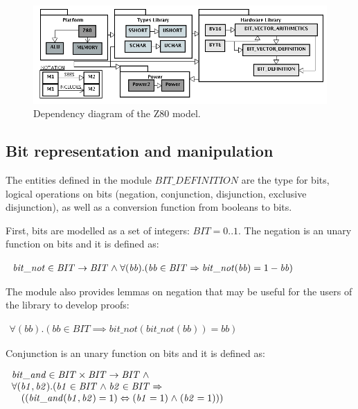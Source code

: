 \documentclass[11pt]{article} %
\begin{document}
\begin{figure}[h] \centering
\includegraphics[width=.92\textwidth]{diagramaEstrutural_vertical.png}
 \caption{Dependency diagram of the Z80 model.}
\label{fig:hardware-definition-graph}
\end{figure}



\subsection{Bit representation and manipulation}

The entities defined in the module $\mathit{BIT\_DEFINITION}$ are the
type for bits, logical operations on bits (negation, conjunction,
disjunction, exclusive disjunction), as well as a conversion function
from booleans to bits.

First, bits are modelled as a set of integers: $\mathit{BIT} =
\mathit{0..1}$. The negation is an unary function on bits and it is
defined as:

$
\begin{array}{l}
\mathit{bit\_not}  \in  \mathit{BIT}  \fun  \mathit{BIT}  \land \forall ( \mathit{bb}). (\mathit{bb} \in \mathit{BIT} \implies \mathit{bit\_not}(\mathit{bb}) =
1-\mathit{bb})\\
\end{array}
$

The module also provides lemmas on negation that may be useful for the
users of the library to develop proofs:

$
\begin{array}{l}
\forall (\mathit{bb}).(\mathit{bb} \in \mathit{BIT} \implies \mathit{bit\_not}(\mathit{bit\_not}(\mathit{bb})) = \mathit{bb})
\end{array}
$

Conjunction is an unary function on bits and it is defined as:

$
\begin{array}{l}
\mathit{bit\_and} \in \mathit{BIT} \times \mathit{BIT} \fun \mathit{BIT} \land \\
\forall (\mathit{b1}, \mathit{b2}).(\mathit{b1}  \in \mathit{BIT}  \land \mathit{b2} \in \mathit{BIT} \implies \\
\quad ((\mathit{bit\_and}(\mathit{b1}, \mathit{b2}) = 1) \iff (\mathit{b1} = 1)  \land  (\mathit{b2} = 1)))
\end{array}
$
\end{document}
